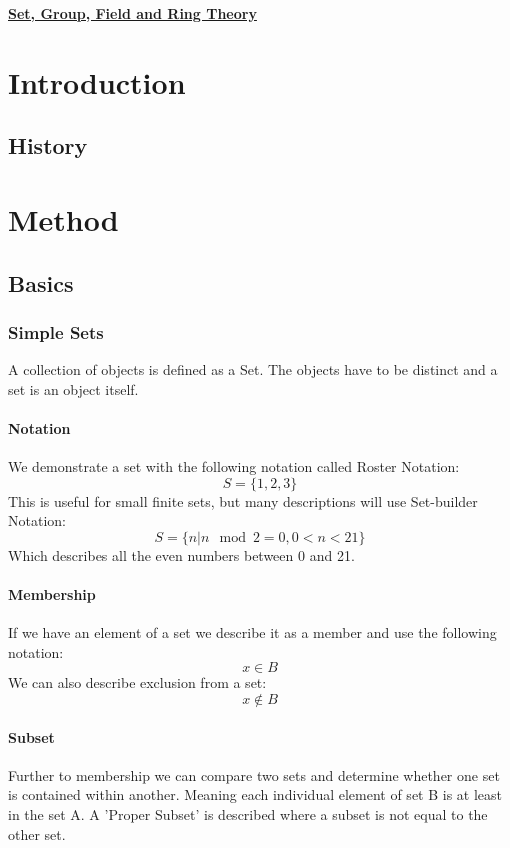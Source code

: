\documentclass[10pt,a4paper]{report}
\begin{document}
	\begin{center}
		\underline{\textbf{Set, Group, Field and Ring Theory}}
	\end{center}

\tableofcontents

\part{Introduction}
\chapter{History}

\part{Method}
\chapter{Basics}
\section{Simple Sets}
A collection of objects is defined as a Set. The objects have to be distinct and a set is an object itself.
\subsection*{Notation}
We demonstrate a set with the following notation called Roster Notation:
\begin{equation}
S = \{1,2,3\}
\end{equation}
This is useful for small finite sets, but many descriptions will use Set-builder Notation:
\begin{equation}
S = \{n | n \mod2 = 0, 0<n<21\}
\end{equation}
Which describes all the even numbers between 0 and 21.
\subsection*{Membership}
If we have an element of a set we describe it as a member and use the following notation:
\begin{equation}
	x \in B
\end{equation}
We can also describe exclusion from a set:
\begin{equation}
	x \notin B
\end{equation}

\subsection*{Subset}
Further to membership we can compare two sets and determine whether one set is contained within another. Meaning each individual element of set B is at least in the set A. A 'Proper Subset' is described where a subset is not equal to the other set.
\end{document}
